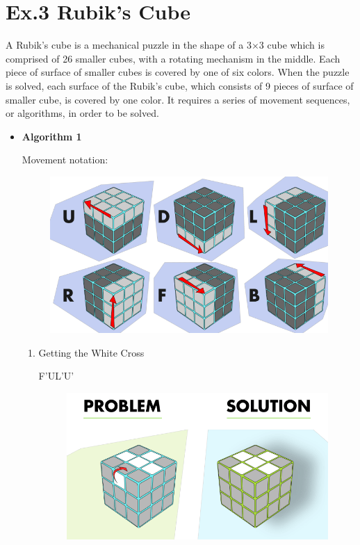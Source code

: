 \documentclass[a4paper]{article}
\begin{document}
\section*{Ex.3 Rubik’s Cube}
A Rubik's cube is a mechanical puzzle in the shape of a 3$\times$3 cube which is comprised of 26 smaller cubes, with a rotating mechanism in the middle. Each piece of surface of smaller cubes is covered by one of six colors. When the puzzle is solved, each surface of the Rubik's cube, which consists of 9 pieces of surface of smaller cube, is covered by one color.  It requires a series of movement sequences, or algorithms, in order to be solved.
\newpage
\begin{itemize}
	\item {\bf Algorithm 1\cite{ref1}}\par
	Movement notation:
	\begin{figure}[!ht]
		\centering
		\includegraphics[scale=0.2]{1-0.png}
	\end{figure}
	\begin{enumerate}
		\item Getting the White Cross\par
		F'UL'U'
		\begin{figure}[!ht]
			\centering
			\includegraphics[scale=0.2]{1-1.png}

\end{figure}
\end{enumerate}
\end{itemize}
\end{document}
